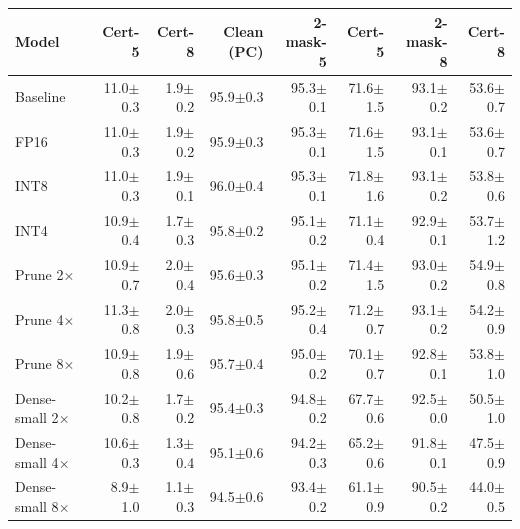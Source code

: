 \begin{tabular}{lrrrrrrr}
\toprule
Model & Cert-5 & Cert-8 & Clean (PC) & 2-mask-5 & Cert-5 & 2-mask-8 & Cert-8 \\
\midrule
Baseline & 11.0{\scriptsize$\pm$0.3} & 1.9{\scriptsize$\pm$0.2} & 95.9{\scriptsize$\pm$0.3} & 95.3{\scriptsize$\pm$0.1} & 71.6{\scriptsize$\pm$1.5} & 93.1{\scriptsize$\pm$0.2} & 53.6{\scriptsize$\pm$0.7} \\
\midrule
FP16 & 11.0{\scriptsize$\pm$0.3} & 1.9{\scriptsize$\pm$0.2} & 95.9{\scriptsize$\pm$0.3} & 95.3{\scriptsize$\pm$0.1} & 71.6{\scriptsize$\pm$1.5} & 93.1{\scriptsize$\pm$0.1} & 53.6{\scriptsize$\pm$0.7} \\
INT8 & 11.0{\scriptsize$\pm$0.3} & 1.9{\scriptsize$\pm$0.1} & 96.0{\scriptsize$\pm$0.4} & 95.3{\scriptsize$\pm$0.1} & 71.8{\scriptsize$\pm$1.6} & 93.1{\scriptsize$\pm$0.2} & 53.8{\scriptsize$\pm$0.6} \\
INT4 & 10.9{\scriptsize$\pm$0.4} & 1.7{\scriptsize$\pm$0.3} & 95.8{\scriptsize$\pm$0.2} & 95.1{\scriptsize$\pm$0.2} & 71.1{\scriptsize$\pm$0.4} & 92.9{\scriptsize$\pm$0.1} & 53.7{\scriptsize$\pm$1.2} \\
\midrule
Prune 2$\times$ & 10.9{\scriptsize$\pm$0.7} & 2.0{\scriptsize$\pm$0.4} & 95.6{\scriptsize$\pm$0.3} & 95.1{\scriptsize$\pm$0.2} & 71.4{\scriptsize$\pm$1.5} & 93.0{\scriptsize$\pm$0.2} & 54.9{\scriptsize$\pm$0.8} \\
Prune 4$\times$ & 11.3{\scriptsize$\pm$0.8} & 2.0{\scriptsize$\pm$0.3} & 95.8{\scriptsize$\pm$0.5} & 95.2{\scriptsize$\pm$0.4} & 71.2{\scriptsize$\pm$0.7} & 93.1{\scriptsize$\pm$0.2} & 54.2{\scriptsize$\pm$0.9} \\
Prune 8$\times$ & 10.9{\scriptsize$\pm$0.8} & 1.9{\scriptsize$\pm$0.6} & 95.7{\scriptsize$\pm$0.4} & 95.0{\scriptsize$\pm$0.2} & 70.1{\scriptsize$\pm$0.7} & 92.8{\scriptsize$\pm$0.1} & 53.8{\scriptsize$\pm$1.0} \\
\midrule
Dense-small 2$\times$ & 10.2{\scriptsize$\pm$0.8} & 1.7{\scriptsize$\pm$0.2} & 95.4{\scriptsize$\pm$0.3} & 94.8{\scriptsize$\pm$0.2} & 67.7{\scriptsize$\pm$0.6} & 92.5{\scriptsize$\pm$0.0} & 50.5{\scriptsize$\pm$1.0} \\
Dense-small 4$\times$ & 10.6{\scriptsize$\pm$0.3} & 1.3{\scriptsize$\pm$0.4} & 95.1{\scriptsize$\pm$0.6} & 94.2{\scriptsize$\pm$0.3} & 65.2{\scriptsize$\pm$0.6} & 91.8{\scriptsize$\pm$0.1} & 47.5{\scriptsize$\pm$0.9} \\
Dense-small 8$\times$ & 8.9{\scriptsize$\pm$1.0} & 1.1{\scriptsize$\pm$0.3} & 94.5{\scriptsize$\pm$0.6} & 93.4{\scriptsize$\pm$0.2} & 61.1{\scriptsize$\pm$0.9} & 90.5{\scriptsize$\pm$0.2} & 44.0{\scriptsize$\pm$0.5} \\

\end{tabular}
